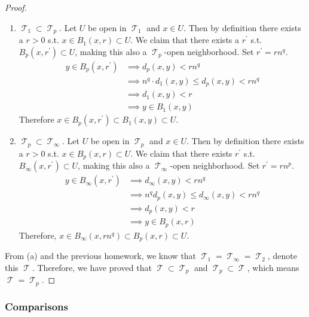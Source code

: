 \documentclass{article}
\DeclareMathOperator{\T}{\mathscr{T}}
\begin{document}
\begin{proof}
        \begin{enumerate} 
          \item $\T_1 \subset \T_p$. Let $U$ be open in $\T_1$ and $x \in U$. Then by definition there exists a $r > 0$ s.t. $x \in B_1 (x, r) \subset U$. We claim that there exists a $r^\prime$ s.t. $B_p (x, r^\prime) \subset U$, making this also a $\T_p$-open neighborhood. Set $r^\prime = r n^q$. 
          \begin{align}
            y \in B_p (x, r^\prime) & \implies d_p (x, y) < r n^q \\
                                    & \implies n^q \cdot d_1 (x, y) \leq d_p (x, y) < r n^q \\
                                    & \implies d_1 (x, y) < r \\
                                    & \implies y \in B_1 (x, y)
          \end{align}
          Therefore $x \in B_p (x, r^\prime) \subset B_1 (x, y) \subset U$. 

          \item $\T_p \subset \T_\infty$. Let $U$ be open in $\T_p$ and $x \in U$. Then by definition there exists a $r > 0$ s.t. $x \in B_p (x, r) \subset U$. We claim that there exists $r^\prime$ s.t. $B_\infty (x, r^\prime) \subset U$, making this also a $\T_\infty$-open neighborhood. Set $r^\prime = r n^p$. 
          \begin{align}
            y \in B_\infty (x, r^\prime) & \implies d_\infty (x, y) < r n^q \\
                                         & \implies n^q d_p (x, y) \leq d_\infty (x, y) < r n^q  \\
                                         & \implies d_p (x, y) < r \\
                                         & \implies y \in B_p (x, r)
          \end{align}
          Therefore, $x \in B_\infty (x, r n^q) \subset B_p (x, r) \subset U$. 
        \end{enumerate} 

        From (a) and the previous homework, we know that $\T_1 = \T_\infty = \T_2$, denote this $\T$. Therefore, we have proved that $\T \subset \T_p$ and $\T_p \subset \T$, which means $\T = \T_p$. 
      \end{proof}

    \subsubsection{Comparisons} 
\end{document}

